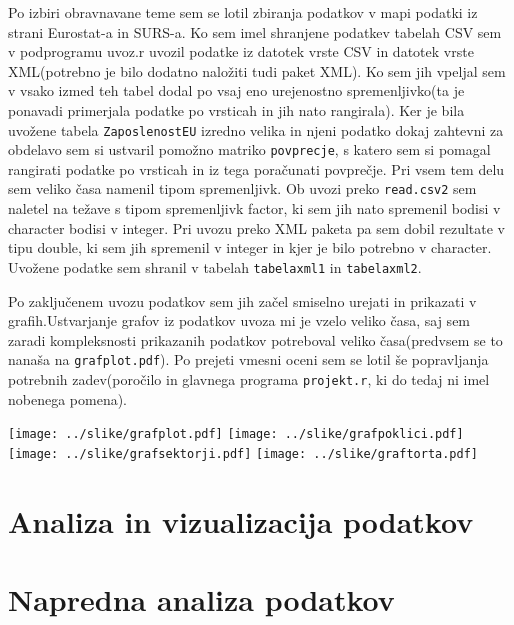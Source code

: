 \documentclass[11pt,a4paper]{article}
\begin{document}
Po izbiri obravnavane teme sem se lotil zbiranja podatkov v mapi podatki iz strani Eurostat-a in SURS-a. Ko sem imel shranjene podatkev tabelah CSV sem v podprogramu uvoz.r uvozil podatke iz datotek vrste CSV in datotek vrste XML(potrebno je bilo dodatno naložiti tudi paket XML). Ko sem jih vpeljal sem v vsako izmed teh tabel dodal po vsaj eno urejenostno spremenljivko(ta je ponavadi primerjala podatke po vrsticah in jih nato rangirala). Ker je bila uvožene tabela \verb|ZaposlenostEU| izredno velika in njeni podatko dokaj zahtevni za obdelavo sem si ustvaril pomožno matriko \verb|povprecje|, s katero sem si pomagal rangirati podatke po vrsticah in iz tega poračunati povprečje. Pri vsem tem delu sem veliko časa namenil tipom spremenljivk. Ob uvozi preko \verb|read.csv2| sem naletel na težave s tipom spremenljivk factor, ki sem jih nato spremenil bodisi v character bodisi v integer. Pri uvozu preko XML paketa pa sem dobil rezultate v tipu double, ki sem jih spremenil v integer in kjer je bilo potrebno v character. Uvožene podatke sem shranil v tabelah \verb|tabelaxml1| in \verb|tabelaxml2|.

Po zaključenem uvozu podatkov sem jih začel smiselno urejati in prikazati v grafih.Ustvarjanje grafov iz podatkov uvoza mi je vzelo veliko časa, saj sem zaradi kompleksnosti prikazanih podatkov potreboval veliko časa(predvsem se to nanaša na \verb|grafplot.pdf|). Po prejeti vmesni oceni sem se lotil še popravljanja potrebnih zadev(poročilo in glavnega programa \verb|projekt.r|, ki do tedaj ni imel nobenega pomena).

\texttt{[image: ../slike/grafplot.pdf]}
\texttt{[image: ../slike/grafpoklici.pdf]}
\texttt{[image: ../slike/grafsektorji.pdf]}
\texttt{[image: ../slike/graftorta.pdf]}

\section{Analiza in vizualizacija podatkov}


\section{Napredna analiza podatkov}
\end{document}
